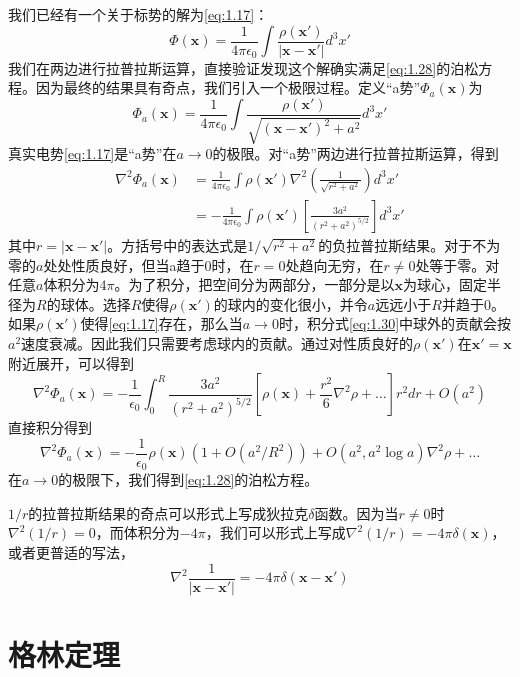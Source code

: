\documentclass[12pt]{book}
\numberwithin{equation}{chapter}
\numberwithin{figure}{chapter}
\numberwithin{footnote}{page}
\begin{document}
我们已经有一个关于标势的解为\autoref{eq:1.17}：
$$\Phi(\mathbf{x})=\frac{1}{4\pi\epsilon_0}\int \frac{\rho(\mathbf{x'})}{|\mathbf{x}-\mathbf{x'}|}d^3x'$$
我们在两边进行拉普拉斯运算，直接验证发现这个解确实满足\autoref{eq:1.28}的泊松方程。因为最终的结果具有奇点，我们引入一个极限过程。定义“a势”$\Phi_a(\mathbf{x})$为
$$\Phi_a(\mathbf{x})=\frac{1}{4\pi\epsilon_0}\int \frac{\rho(\mathbf{x'})}{\sqrt{(\mathbf{x}-\mathbf{x'})^2+a^2}}d^3x'$$
真实电势\autoref{eq:1.17}是“a势”在$a\to 0$的极限。对“a势”两边进行拉普拉斯运算，得到
\begin{equation}\label{eq:1.30}
    \begin{aligned}
        \nabla^2\Phi_a(\mathbf{x})&=\frac{1}{4\pi\epsilon_0}\int\rho(\mathbf{x'})\nabla^2(\frac{1}{\sqrt{r^2+a^2}})d^3x'\\
        &=-\frac{1}{4\pi\epsilon_0}\int\rho(\mathbf{x'})[\frac{3a^2}{(r^2+a^2)^{5/2}}]d^3x'
    \end{aligned}
\end{equation}
其中$r=|\mathbf{x}-\mathbf{x'}|$。方括号中的表达式是$1/\sqrt{r^2+a^2}$的负拉普拉斯结果。对于不为零的$a$处处性质良好，但当a趋于0时，在$r=0$处趋向无穷，在$r\neq0$处等于零。对任意$a$体积分为$4\pi$。为了积分，把空间分为两部分，一部分是以$\mathbf{x}$为球心，固定半径为$R$的球体。选择$R$使得$\rho(\mathbf{x'})$的球内的变化很小，并令$a$远远小于$R$并趋于0。如果$\rho(\mathbf{x'})$使得\autoref{eq:1.17}存在，那么当$a\to 0$时，积分式\autoref{eq:1.30}中球外的贡献会按$a^2$速度衰减。因此我们只需要考虑球内的贡献。通过对性质良好的$\rho(\mathbf{x'})$在$\mathbf{x'}=\mathbf{x}$附近展开，可以得到
$$\nabla^2\Phi_a(\mathbf{x})=-\frac{1}{\epsilon_0}\int_0^R\frac{3a^2}{(r^2+a^2)^{5/2}}[\rho(\mathbf{x})+\frac{r^2}{6}\nabla^2\rho+\dots]r^2dr+O(a^2)$$
直接积分得到
$$\nabla^2\Phi_a(\mathbf{x})=-\frac{1}{\epsilon_0}\rho(\mathbf{x})(1+O(a^2/R^2))+O(a^2,a^2\log a)\nabla^2\rho+\dots$$
在$a\to 0$的极限下，我们得到\autoref{eq:1.28}的泊松方程。

$1/r$的拉普拉斯结果的奇点可以形式上写成狄拉克$\delta$函数。因为当$r\neq0$时$\nabla^2(1/r)=0$，而体积分为$-4\pi$，我们可以形式上写成$\nabla^2(1/r)=-4\pi\delta(\mathbf{x})$，或者更普适的写法，
\begin{equation}\label{eq:1.31}
    \nabla^2\frac{1}{|\mathbf{x}-\mathbf{x'}|}=-4\pi\delta(\mathbf{x}-\mathbf{x'})
\end{equation}

\section{格林定理}\label{sec:1.8}
\end{document}
